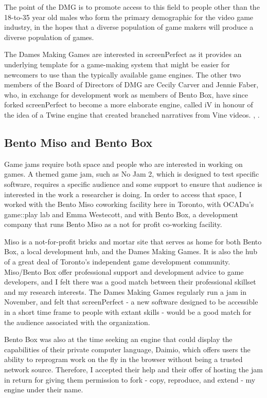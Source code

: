 The point of the DMG is to promote access to this field to people other than the 18-to-35 year old males who form the primary demographic for the video game industry, in the hopes that a diverse population of game makers will produce a diverse population of games. 

The Dames Making Games are interested in screenPerfect as it provides an underlying template for a game-making system that might be easier for newcomers to use than the typically available game engines. The other two members of the Board of Directors of DMG are Cecily Carver and Jennie Faber, who, in exchange for development work as members of Bento Box, have since forked screenPerfect to become a more elaborate engine, called iV in honour of the idea of a Twine engine that created branched narratives from Vine videos. \cite{iv}, \cite{twine}.

\subsection{Bento Miso and Bento Box}
Game jams require both space and people who are interested in working on games. A themed game jam, such as No Jam 2, which is designed to test specific software, requires a specific audience and some support to ensure that audience is interested in the work a researcher is doing. In order to access that space, I worked with the Bento Miso coworking facility here in Toronto, with OCADu's game::play lab and Emma Westecott, and with Bento Box, a development company that runs Bento Miso as a not for profit co-working facility. 

Miso is a not-for-profit bricks and mortar site that serves as home for both Bento Box, a local development hub, and the Dames Making Games. It is also the hub of a great deal of Toronto's independent game development community. Miso/Bento Box offer professional support and development advice to game developers, and I felt there was a good match between their professional skillset and my research interests. The Dames Making Games regularly run a jam in November, and felt that screenPerfect - a new software designed to be accessible in a short time frame to people with extant skills - would be a good match for the audience associated with the organization.

Bento Box was also at the time seeking an engine that could display the capabilities of their private computer language, Daimio, which offers users the ability to reprogram work on the fly in the browser without being a trusted network source. Therefore, I accepted their help and their offer of hosting the jam in return for giving them permission to fork - copy, reproduce, and extend - my engine under their name.

